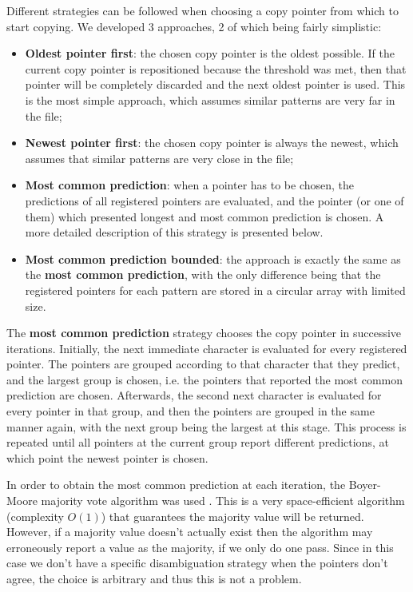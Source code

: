 \documentclass{article}
\begin{document}
Different strategies can be followed when choosing a copy pointer from which to start copying.
We developed 3 approaches, 2 of which being fairly simplistic:
\begin{itemize}
    \item \textbf{Oldest pointer first}: the chosen copy pointer is the oldest possible. If the current copy pointer is repositioned because the threshold was met, then that pointer will be completely discarded and the next oldest pointer is used.
    This is the most simple approach, which assumes similar patterns are very far in the file;
    \item \textbf{Newest pointer first}: the chosen copy pointer is always the newest, which assumes that similar patterns are very close in the file;
    \item \textbf{Most common prediction}: when a pointer has to be chosen, the predictions of all registered pointers are evaluated, and the pointer (or one of them) which presented longest and most common prediction is chosen.
    A more detailed description of this strategy is presented below.
    \item \textbf{Most common prediction bounded}: the approach is exactly the same as the \textbf{most common prediction}, with the only difference being that the registered pointers for each pattern are stored in a circular array with limited size.
\end{itemize}

The \textbf{most common prediction} strategy chooses the copy pointer in successive iterations.
Initially, the next immediate character is evaluated for every registered pointer.
The pointers are grouped according to that character that they predict, and the largest group is chosen, i.e. the pointers that reported the most common prediction are chosen.
Afterwards, the second next character is evaluated for every pointer in that group, and then the pointers are grouped in the same manner again, with the next group being the largest at this stage.
This process is repeated until all pointers at the current group report different predictions, at which point the newest pointer is chosen.

In order to obtain the most common prediction at each iteration, the Boyer-Moore majority vote algorithm was used \cite{majority}.
This is a very space-efficient algorithm (complexity $O(1)$) that guarantees the majority value will be returned.
However, if a majority value doesn't actually exist then the algorithm may erroneously report a value as the majority, if we only do one pass.
Since in this case we don't have a specific disambiguation strategy when the pointers don't agree, the choice is arbitrary and thus this is not a problem.
\end{document}
